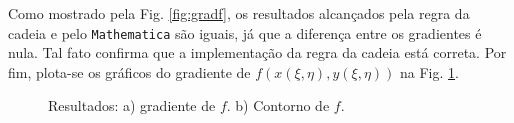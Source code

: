 Como mostrado pela Fig. \ref{fig:gradf}, os resultados alcan\c{c}ados pela regra da cadeia e pelo \texttt{Mathematica} s\~ao iguais, j\'a que a diferen\c{c}a entre os gradientes \'e nula. Tal fato confirma que a implementa\c{c}\~ao da regra da cadeia est\'a correta. Por fim, plota-se os gr\'aficos do gradiente de $f(x(\xi, \eta), y(\xi, \eta))$ na Fig. \ref{fig:gradfplot}.
\begin{figure}[H]
    \centering
    \hfill
    \caption{Resultados: a) gradiente de $f$. b) Contorno de $f$.}
    \label{fig:gradfplot}
\end{figure}
